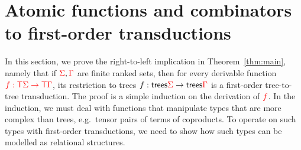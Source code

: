 \newcommand{\Root}[1]{\mathsf{root}_{#1}}
\newcommand{\Port}[1]{\mathsf{port}_{#1}}
\newcommand{\Interface}[1]{\mathsf{Interface}_{#1}}
\section{Atomic functions and combinators to first-order transductions}
\label{sec:to-transductions}
In this section, we prove the right-to-left implication in Theorem~\ref{thm:main}, namely that if ${\color{red}{\Sigma}},{\color{red}{\Gamma}}$ are finite ranked sets, then for every derivable function ${\color{red}{f : {\color{red}{\mathsf T}}{\color{red}{\Sigma}}\to {\color{red}{\mathsf T}}{\color{red}{\Gamma}}}}$, its restriction to trees $f : \mathsf {trees} {\color{red}{\Sigma}} \to \mathsf {trees} {\color{red}{\Gamma}}$
is a first-order tree-to-tree transduction. The proof is a simple induction on the derivation of  ${\color{red}{f}}$. In the induction, we must deal with functions that manipulate types that are more complex than trees, e.g.~tensor pairs of terms of coproducts.  To operate on such types with first-order transductions, we need to show how such types can be modelled as relational structures.




